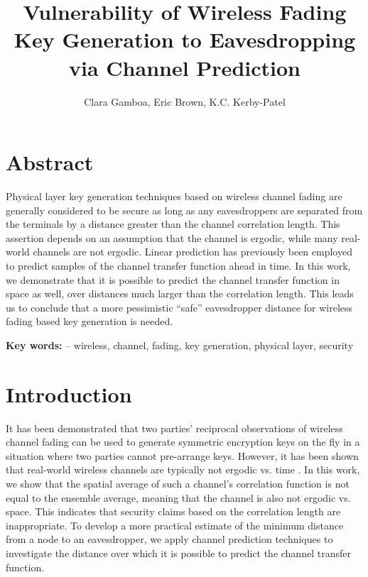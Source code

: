 \documentclass[11pt]{article} %
\title{Vulnerability of Wireless Fading Key Generation to Eavesdropping via Channel Prediction} %
\author{Clara Gamboa, Eric Brown, K.C. Kerby-Patel}  %
\begin{document}
\maketitle

\section{Abstract}

Physical layer key generation techniques based on wireless channel fading are generally considered to be secure as long as any eavesdroppers are separated from the terminals by a distance greater than the channel correlation length.  This assertion depends on an assumption that the channel is ergodic, while many real-world channels are not ergodic.  Linear prediction has previously been employed to predict samples of the channel transfer function ahead in time.  In this work, we demonstrate that it is possible to predict the channel transfer function in space as well, over distances much larger than the correlation length.  %
This leads us to conclude that a more pessimistic ``safe'' eavesdropper distance for wireless fading based key generation is needed.

\textbf{Key words:} -- wireless, channel, fading, key generation, physical layer, security

\section{Introduction}

It has been demonstrated \cite{anyPLkeygenpaper} that two parties' reciprocal observations of wireless channel fading can be used to generate symmetric encryption keys on the fly in a situation where two parties cannot pre-arrange keys. 
However, it has been shown that real-world wireless channels are typically not ergodic vs. time \cite{isukapalli}.  In this work, we show that the spatial average of such a channel's correlation function is not equal to the ensemble average, meaning that the channel is also not ergodic vs. space.  This indicates that security claims based on the correlation length are inappropriate.  To develop a more practical estimate of the minimum distance from a node to an eavesdropper, we apply channel prediction techniques \cite{any duel-hallen paper} to investigate the distance over which it is possible to predict the channel transfer function.
\end{document}
